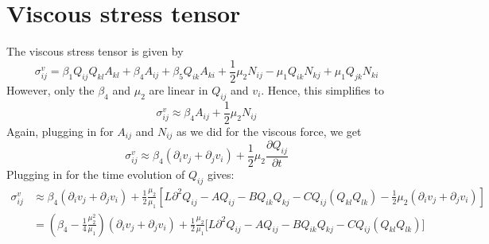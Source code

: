 \documentclass[reqno]{article}
\begin{document}
	\section{Viscous stress tensor}
	The viscous stress tensor is given by
	\begin{equation}
	\sigma^v_{ij} = \beta_1 Q_{ij}Q_{kl}A_{kl} + \beta_4 A_{ij} + \beta_5 Q_{ik} A_{ki} + \frac{1}{2} \mu_2 N_{ij} - \mu_1 Q_{ik}N_{kj} + \mu_1 Q_{jk}N_{ki}
	\end{equation}
	However, only the $\beta_4$ and $\mu_2$ are linear in $Q_{ij}$ and $v_i$. Hence, this simplifies to
	\begin{equation}
	\sigma^v_{ij} \approx \beta_4 A_{ij} + \frac{1}{2} \mu_2 N_{ij}
	\end{equation}
	Again, plugging in for $A_{ij}$ and $N_{ij}$ as we did for the viscous force, we get
	\begin{equation}\label{eq:visc-stress}
	\sigma^v_{ij} \approx \beta_4 (\partial_i v_j + \partial_j v_i) + \frac{1}{2} \mu_2  \frac{\partial Q_{ij}}{\partial t}
	\end{equation}
	Plugging in for the time evolution of $Q_{ij}$ gives:
	\begin{equation}
	\begin{split}
		\sigma^v_{ij} &\approx 
		\beta_4 \left(\partial_i v_j + \partial_j v_i\right)
		+ \frac12 \frac{\mu_2}{\mu_1} \left[
		L\partial^2 Q_{ij}
		- A Q_{ij}
		- B Q_{ik} Q_{kj}
		- C Q_{ij} \left( Q_{kl} Q_{lk} \right)
		- \frac12 \mu_2 \left( \partial_i v_j + \partial_j v_i \right)
		\right] \\
		&= \left(\beta_4 - \frac14 \frac{\mu_2^2}{\mu_1} \right)
		\left( \partial_i v_j + \partial_j v_i \right)
		+ \frac12 \frac{\mu_2}{\mu_1} \biggl[
		L\partial^2 Q_{ij}
		- A Q_{ij}
		- B Q_{ik} Q_{kj}
		- C Q_{ij} \left( Q_{kl} Q_{lk} \right)
		\biggr]
	\end{split}
	\end{equation}
	
\end{document}
